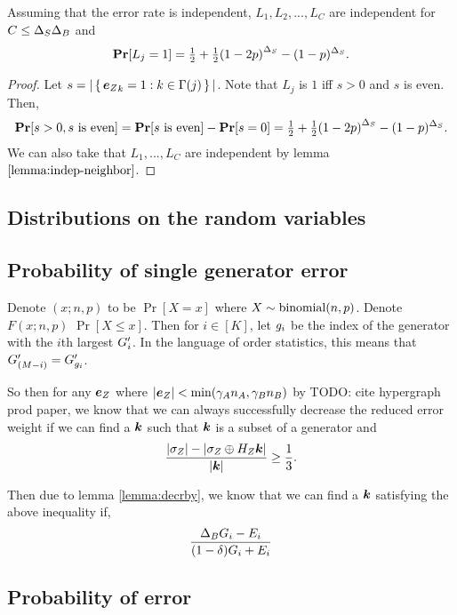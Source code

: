 \begin{lemma}{
	Assuming that the error rate is independent,
	$L_1, L_2, ..., L_C$ are independent for $C \leq {\Delta_{S}} {\Delta_{B}}$ and
	$$
		\Pr[L_j = 1] = \PrL.
	$$
}
\begin{proof}
	Let $s = |\set{{\boldsymbol{e}_Z}_k = 1 : k \in \Gamma(j)}|$.
	Note that $L_j$ is $1$ iff $s > 0$ and $s$ is even.
	Then,
	$$
		\Pr[s > 0, s \text{ is even}] = \Pr[s\text{ is even}] - \Pr[s = 0] = \PrL.
	$$
	We can also take that $L_1, ..., L_C$ are independent by lemma $\ref{lemma:indep-neighbor}$.
\end{proof}
\end{lemma}


\subsection*{Distributions on the random variables}

\subsection*{Probability of single generator error}
Denote $(x; n, p)$ to be $\Pr[X = x]$ where $X \sim \operatorname{binomial}(n, p)$. Denote $F(x; n, p)$ $\Pr[X \leq x]$.
Then for $i \in [K]$, let $g_i$ be the index of the generator with the $i$th largest ${G'_i}$.
In the language of order statistics, this means that ${G'_{(M - i)}} = {G'_{g_i}}$.

So then for any ${\boldsymbol{e}_Z}$ where $|{\boldsymbol{e}_Z}| < \min(\gamma_An_A, \gamma_Bn_B)$ by TODO: cite hypergraph prod paper, we know that we can always successfully
decrease the reduced error weight if we can find a $\boldsymbol{\boldsymbol{k}}$ such that $\boldsymbol{\boldsymbol{k}}$ is a subset of a generator and
$$
	\frac{|\sigma_Z| - |\sigma_Z \oplus H_Z\boldsymbol{\boldsymbol{k}}|}{|\boldsymbol{\boldsymbol{k}}|}	\geq \frac{1}{3}.
$$


Then due to lemma \ref{lemma:decrby}, we know that we can find a $\boldsymbol{\boldsymbol{k}}$ satisfying the above inequality if,
$$
	\frac{{\Delta_{B}} {G_i} - {E_i}}{(1 - \delta) {G_i} + {E_i}}
$$

\subsection*{Probability of error}

